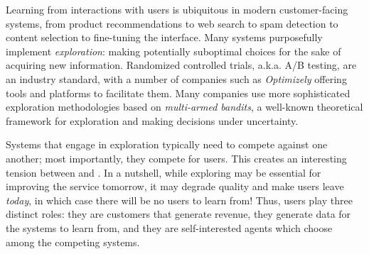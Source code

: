 Learning from interactions with users is ubiquitous in modern customer-facing systems, from product recommendations to web search to spam detection to content selection to fine-tuning the interface. Many systems purposefully implement \emph{exploration}: making potentially suboptimal choices for the sake of acquiring new information. Randomized controlled trials, a.k.a. A/B testing, are an industry standard, with a number of companies such as \emph{Optimizely} offering tools and platforms to facilitate them. Many companies use more sophisticated exploration methodologies based on \emph{multi-armed bandits}, a well-known theoretical framework for exploration and making decisions under uncertainty.


Systems that engage in exploration typically need to compete against one another; most importantly, they compete for users. This creates an interesting tension between \exploration and \competition. In a nutshell, while exploring may be essential for improving the service tomorrow, it may degrade quality and make users leave \emph{today}, in which case there will be no users to learn from! Thus, users play three distinct roles: they are customers that generate revenue, they generate data for the systems to learn from, and they are self-interested agents which choose among the competing systems.

